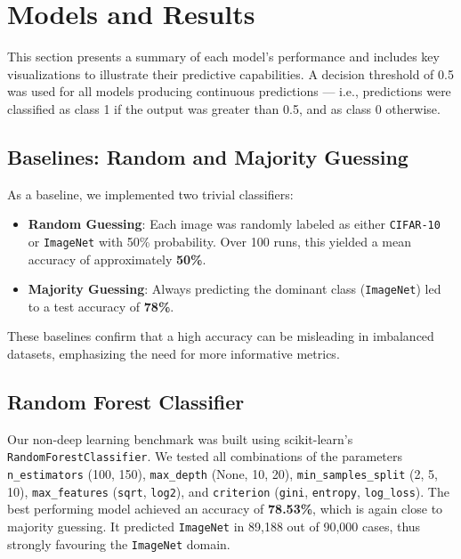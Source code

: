 \section{Models and Results}
\label{sec:Models and Results}
This section presents a summary of each model's performance and includes key visualizations to illustrate their predictive capabilities.
A decision threshold of 0.5 was used for all models producing continuous predictions — i.e., predictions were classified as class 1 if the output 
was greater than 0.5, and as class 0 otherwise.

\subsection{Baselines: Random and Majority Guessing}

As a baseline, we implemented two trivial classifiers:

\begin{itemize}
    \item \textbf{Random Guessing}: Each image was randomly labeled as either \texttt{CIFAR-10} or \texttt{ImageNet} with 50\% probability. Over 100 runs, this yielded a mean accuracy of approximately \textbf{50\%}.
    \item \textbf{Majority Guessing}: Always predicting the dominant class (\texttt{ImageNet}) led to a test accuracy of \textbf{78\%}.
\end{itemize}

These baselines confirm that a high accuracy can be misleading in imbalanced datasets, emphasizing the need for more informative metrics.

\subsection{Random Forest Classifier}

Our non-deep learning benchmark was built using scikit-learn's \texttt{RandomForestClassifier}. We tested all combinations of the parameters 
\texttt{n\_estimators} (100, 150), \texttt{max\_depth} (None, 10, 20), \texttt{min\_samples\_split} (2, 5, 10), \texttt{max\_features} (\texttt{sqrt}, \texttt{log2}), 
and \texttt{criterion} (\texttt{gini}, \texttt{entropy}, \texttt{log\_loss}). The best performing model achieved an accuracy of \textbf{78.53\%}, 
which is again close to majority guessing. It predicted \texttt{ImageNet} in 89,188 out of 90,000 cases, thus strongly favouring the \texttt{ImageNet} domain.

